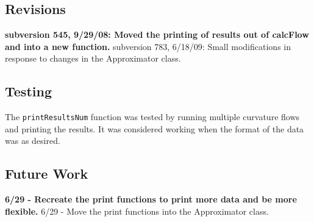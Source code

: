 \documentclass[10pt]{article}%
\begin{document}
\subsection*{Revisions}

 \textbf{ subversion 545, 9/29/08: Moved the printing of results out of calcFlow and into a new function.  }
 subversion 783, 6/18/09: Small modifications in response to changes in the Approximator class.

\subsection*{Testing}

The \texttt{printResultsNum} function was tested by running multiple
curvature flows and printing the results. It was considered working
when the format of the data was as desired.

\subsection*{Future Work}

\textbf{ 6/29 - Recreate the print functions to print more data and be more flexible.}
 6/29 - Move the print functions into the Approximator class.
    

%
\end{document}
